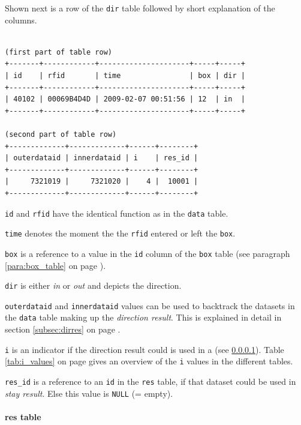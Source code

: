 Shown next is a row of the \lstinline|dir| table followed by short explanation of the columns.

\codescript
\begin{lstlisting}[frame=none]

(first part of table row)
+-------+------------+---------------------+-----+-----+
| id    | rfid       | time                | box | dir |
+-------+------------+---------------------+-----+-----+
| 40102 | 00069B4D4D | 2009-02-07 00:51:56 | 12  | in  |
+-------+------------+---------------------+-----+-----+

(second part of table row)
+-------------+-------------+------+--------+
| outerdataid | innerdataid | i    | res_id |
+-------------+-------------+------+--------+
|     7321019 |     7321020 |    4 |  10001 | 
+-------------+-------------+------+--------+
\end{lstlisting}

\begin{mydesc}
  \item \lstinline|id| and \lstinline|rfid| have the identical function as in the \lstinline|data| table.
  \item \lstinline|time| denotes the moment the the \lstinline|rfid| entered or left the \lstinline|box|.
  \item \lstinline|box| is a reference to a value in the \lstinline|id| column of the \lstinline|box| table (see paragraph \ref{para:box_table} on page \pageref{para:box_table}).
  \item \lstinline|dir| is either \textit{in} or \textit{out} and depicts the direction.
  \item \lstinline|outerdataid| and \lstinline|innerdataid| values can be used to backtrack the datasets in the \lstinline|data| table making up the \textit{direction result}. This is explained in detail in section \ref{subsec:dirres} on page \pageref{subsec:dirres}.
  \item \lstinline|i| is an indicator if the direction result could is used in a \textit{} (see \ref{para:res_table}). Table \ref{tab:i_values} on page \pageref{tab:i_values} gives an overview of the \lstinline|i| values in the different tables.
  \item \lstinline|res_id| is a reference to an \lstinline|id| in the \lstinline|res| table, if that dataset could be used in \textit{stay result}. Else this value is \lstinline|NULL| (= empty).
\end{mydesc}

\paragraph{res table}
\label{para:res_table}

